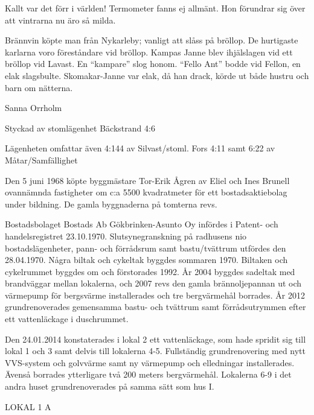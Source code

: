 Kallt var det förr i världen! Termometer fanns ej allmänt. Hon förundrar sig över att vintrarna nu äro så milda.

Brännvin köpte man från Nykarleby; vanligt att slåss på bröllop. De hurtigaste karlarna voro föreståndare vid bröllop. Kampas Janne blev ihjälslagen vid ett bröllop vid Lavast. En ``kampare'' slog honom. ``Fello Ant''  bodde vid Fellon, en elak slagsbulte. Skomakar-Janne var elak, då han drack, körde ut både hustru och barn om nätterna.

Sanna Orrholm



%

Styckad av stomlägenhet Bäckstrand 4:6


Lägenheten omfattar även  4:144 av Silvast/stoml. Fors 4:11 samt  6:22 av Måtar/Samfällighet


%
Den 5 juni 1968 köpte byggmästare Tor-Erik Ågren av Eliel och Ines Brunell ovannämnda fastigheter om c:a 5500 kvadratmeter för ett bostadsaktiebolag under bildning. De gamla byggnaderna på tomterna revs.

Bostadsbolaget Bostads Ab Gökbrinken-Asunto Oy infördes i Patent- och handelsregistret 23.10.1970. Slutsynegranskning på radhusens nio bostadslägenheter, pann- och förrådsrum samt bastu/tvättrum utfördes den 28.04.1970. Några biltak och cykeltak byggdes sommaren 1970. Biltaken och cykelrummet byggdes om och förstorades 1992. År 2004 byggdes sadeltak med brandväggar mellan lokalerna, och 2007 revs den gamla brännoljepannan ut och värmepump för bergsvärme installerades och tre bergvärmehål borrades. År 2012 grundrenoverades gemensamma bastu- och tvättrum samt förrådsutrymmen efter ett vattenläckage i duschrummet.


Den 24.01.2014 konstaterades i lokal 2 ett vattenläckage, som hade spridit sig till lokal 1 och 3 samt delvis till lokalerna 4-5. Fullständig grundrenovering med nytt VVS-system och golvvärme samt ny värmepump och elledningar installerades. Ävenså borrades ytterligare två 200 meters bergvärmehål. Lokalerna 6-9 i det andra huset grundrenoverades på samma sätt som hus I.


LOKAL 1 A

